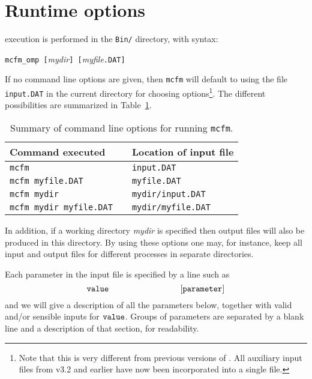 \documentclass{article}
\begin{document}
\section{Runtime options}

\MCFM execution is performed in the {\tt Bin/} directory,
with syntax:
\begin{center}
{\tt mcfm\_omp [}{\it mydir}{\tt ] [}{\it myfile}{\tt .DAT]}
\end{center}
If no command line options are given, then {\tt mcfm} will default
to using the file {\tt input.DAT} in the current directory for
choosing options\footnote{Note that this is very different from
previous versions of \MCFM. All auxiliary input files from v3.2 and
earlier have now been incorporated into a single file.}.
The different possibilities are summarized in Table~\ref{clopts}.
\begin{table}
\begin{center}
\begin{tabular}{l|cl}
Command executed && Location of input file \\
\hline
{\tt mcfm}                      && {\tt input.DAT} \\
{\tt mcfm myfile.DAT}           && {\tt myfile.DAT} \\
{\tt mcfm mydir}                && {\tt mydir/input.DAT} \\
{\tt mcfm mydir myfile.DAT}     && {\tt mydir/myfile.DAT} \\
\end{tabular}
\end{center}
\caption{Summary of command line options for running {\tt mcfm}.}
\label{clopts}
\end{table}
In addition, if a working directory {\it mydir} is specified then
output files will also be produced in this directory. By using these
options one may, for instance, keep all input and output files for
different processes in separate directories.

Each parameter in the input file is specified by a line such as
\begin{displaymath}
{\tt value} \hspace{3cm} {\tt [parameter]}
\end{displaymath}
and we will give a description of all the parameters below, together with
valid and/or sensible inputs for ${\tt value}$. Groups of parameters
are separated by a blank line and a description of that section, for
readability.
\end{document}
